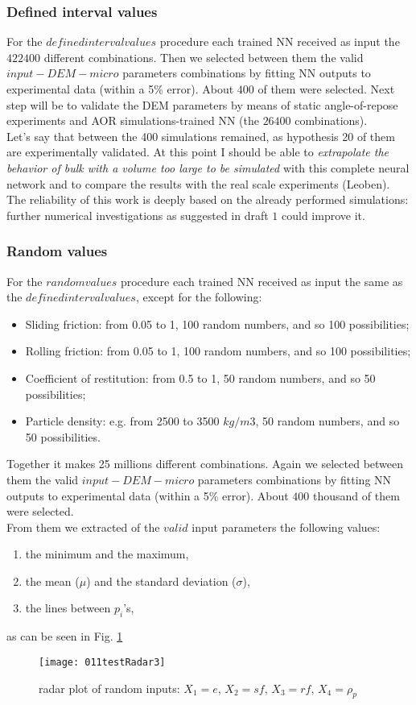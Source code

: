 \subsubsection{Defined interval values}
\label{subsubsection:definedintervalvalues}

For the $defined interval values$ procedure each trained NN received as input the $422400$ different combinations.
Then we selected between them the valid $input-DEM-micro$ parameters combinations by fitting NN outputs to experimental data (within a 5\% error).
About $400$ of them were selected.
Next step will be to validate the DEM parameters by means of static angle-of-repose experiments and AOR simulations-trained NN (the $26400$ combinations).\\

Let's say that between the 400 simulations remained, as hypothesis 20 of them are experimentally validated. At this point I should be able to \textit{extrapolate the behavior of bulk with a volume too large to be simulated} with this complete neural network and to compare the results with the real scale experiments (Leoben).\\

The reliability of this work is deeply based on the already performed simulations: further numerical investigations as suggested in draft $1$ could improve it.\\


\subsubsection{Random values}
\label{subsubsection:randomvalues}

For the $random values$ procedure each trained NN received as input the same as the $defined interval values$, except for the following:
\begin{itemize}
\item{Sliding friction: from 0.05 to 1, 100 random numbers, and so 100 possibilities;}
\item{Rolling friction: from 0.05 to 1, 100 random numbers, and so 100 possibilities;}
\item{Coefficient  of restitution: from 0.5 to 1, 50 random numbers, and so 50 possibilities;}
\item{Particle density: e.g. from 2500 to 3500 $kg/m3$, 50 random numbers, and so 50 possibilities.}
\end{itemize}
Together it makes 25 millions different combinations.
Again we selected between them the valid $input-DEM-micro$ parameters combinations by fitting NN outputs to experimental data (within a 5\% error).
About $400$ thousand of them were selected.\\
From them we extracted of the $valid$ input parameters the following values:
\begin{enumerate}
\item{the minimum and the maximum,}
\item{the mean ($\mu$) and the standard deviation ($\sigma$),}
\item{the lines between $p_i$'s,}
\end{enumerate}
as can be seen in Fig. \ref{011testRadar3}

\begin{figure}[!h]
\texttt{[image: 011testRadar3]}
\caption[radar plot of random inputs]{radar plot of random inputs: $X_1 = e$, $X_2 = sf$, $X_3 = rf$, $X_4 = \rho_p$}
\label{011testRadar3}
\end{figure}